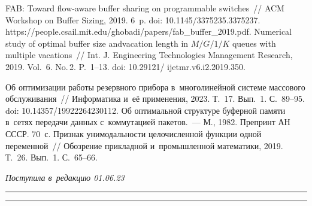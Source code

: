 \begin{multicols}{2}
{{\begin{thebibliography}{99}
 FAB: Toward flow-aware buffer sharing on 
programmable switches~// ACM Workshop on Buffer Sizing, 2019. 6~p. doi: 10.1145/3375235.3375237.  
{\sf https://people.csail.mit.edu/\linebreak  ghobadi/papers/fab\_buffer\_2019.pdf}.
 Numerical study of optimal buffer size and\linebreak vacation length in $M/G/1/K$ queues with 
multiple vacations~// Int. J. Engineering Technologies Management Research, 2019. Vol.~6. 
No.\,2. P.~1--13. doi: 10.29121/ ijetmr.v6.i2.2019.350.

 Об оптимизации работы резервного прибора в~многолинейной сис\-те\-ме 
массового обслуживания~// Информатика и~её применения, 2023. Т.~17. Вып.~1. С.~89--95. 
doi: 10.14357/19922264230112.
 Об оптимальной структуре буферной памяти в~сетях 
передачи данных с~коммутацией пакетов.~--- М., 1982. Препринт АН \mbox{СССР}. 70~с. 
 Признак уни\-мо\-даль\-ности це\-ло\-чис\-лен\-ной функ\-ции одной переменной~// 
Обо\-зре\-ние при\-клад\-ной и~промышленной математики, 2019. Т.~26. Вып.~1. С.~65--66.

\end{thebibliography}

 }
 }

\end{multicols}

\vspace*{-9pt}

\hfill{\small\textit{Поступила в~редакцию 01.06.23}}

\vspace*{6pt}




\hrule

\vspace*{2pt}

\hrule


\def\tit{OPTIMIZATION OF THE BUFFER MEMORY ALLOCATION SCHEME 
OF~THE~PACKET SWITCHING NODE}


\def\titkol{Optimization of the buffer memory allocation scheme 
of~the~packet switching node}


\def\aut{Ya.\,M.~Agalarov}

